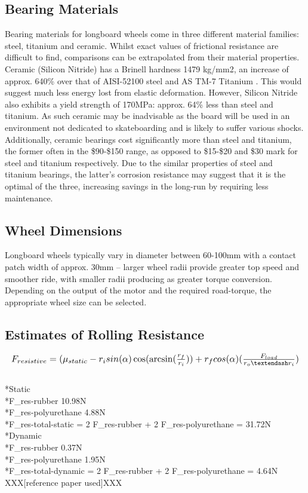 \documentclass[journal,10pt]{IEEEtran}
\begin{document}
    \subsection{Bearing Materials}
        Bearing materials for longboard wheels come in three different material families: steel, titanium and ceramic. Whilst exact values of frictional resistance are difficult to find, comparisons can be extrapolated from their material properties. Ceramic (Silicon Nitride) has a Brinell hardness 1479 kg/mm2, an increase of approx. 640\% over that of AISI-52100 steel and AS   TM-7 Titanium . This would suggest much less energy lost from elastic deformation. However, Silicon Nitride also exhibits a yield strength of 170MPa: approx. 64\% less than steel and titanium. As such ceramic may be inadvisable as the board will be used in an environment not dedicated to skateboarding and is likely to suffer various shocks. Additionally, ceramic bearings cost significantly more than steel and titanium, the former often in the \$90-\$150 range, as opposed to \$15-\$20 and \$30 mark for steel and titanium respectively. Due to the similar properties of steel and titanium bearings, the latter’s corrosion resistance may suggest that it is the optimal of the three, increasing savings in the long-run by requiring less maintenance. 
    \subsection{Wheel Dimensions}
        Longboard wheels typically vary in diameter between 60-100mm with a contact patch width of approx. 30mm – larger wheel radii provide greater top speed and smoother ride, with smaller radii producing as greater torque conversion. Depending on the output of the motor and the required road-torque, the appropriate wheel size can be selected.
    \subsection{Estimates of Rolling Resistance}
    
    \begin{equation*}
        \resizebox{\columnwidth}{!}{%
            $F_{resistive} = (\mu _{static}  -  r_i sin(\alpha) \cos(\arcsin(\frac{r_f}{r_i}))  +  r_f cos(\alpha)(\frac{F_{load}}{r_o – r_i})$%
        }
    \end{equation*}
    {
    \\*Static
    \\*F_{res-rubber} \approx 10.98N	
    \\*F_{res-polyurethane} \approx 4.88N
    \\*F_{res-total-static} = 2 F_{res-rubber} + 2 F_{res-polyurethane} = 31.72N 
    \\*Dynamic
    \\*F_{res-rubber} \approx 0.37N	
    \\*F_{res-polyurethane} \approx 1.95N
    \\*F_{res-total-dynamic} = 2 F_{res-rubber} + 2 F_{res-polyurethane} = 4.64N}
    XXX[reference paper used]XXX
\end{document}
